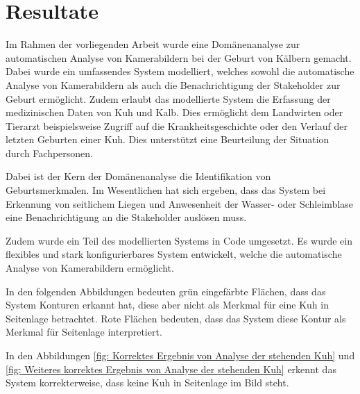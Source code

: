 

\chapter{Resultate}


Im Rahmen der vorliegenden Arbeit wurde eine Domänenanalyse zur automatischen Analyse von Kamerabildern bei der Geburt von Kälbern gemacht. Dabei wurde ein umfassendes System modelliert, welches sowohl die automatische Analyse von Kamerabildern als auch die Benachrichtigung der Stakeholder zur Geburt ermöglicht. Zudem erlaubt das modellierte System die Erfassung der medizinischen Daten von Kuh und Kalb. Dies ermöglicht dem Landwirten oder Tierarzt beispielsweise Zugriff auf die Krankheitsgeschichte oder den Verlauf der letzten Geburten einer Kuh. Dies unterstützt eine Beurteilung der Situation durch Fachpersonen. 

Dabei ist der Kern der Domänenanalyse die Identifikation von Geburtsmerkmalen. Im Wesentlichen hat sich ergeben, dass das System bei Erkennung von seitlichem Liegen und Anwesenheit der Wasser- oder Schleimblase eine Benachrichtigung an die Stakeholder auslösen muss. 

Zudem wurde ein Teil des modellierten Systems in Code umgesetzt. Es wurde ein flexibles und stark konfigurierbares System entwickelt, welche die automatische Analyse von Kamerabildern ermöglicht.

In den folgenden Abbildungen bedeuten grün eingefärbte Flächen, dass das System Konturen erkannt hat, diese aber nicht als Merkmal für eine Kuh in Seitenlage betrachtet. Rote Flächen bedeuten, dass das System diese Kontur als Merkmal für Seitenlage interpretiert.

In den Abbildungen \ref{fig: Korrektes Ergebnis von Analyse der stehenden Kuh} und \ref{fig: Weiteres korrektes Ergebnis von Analyse der stehenden Kuh} erkennt das System korrekterweise, dass keine Kuh in Seitenlage im Bild steht.

